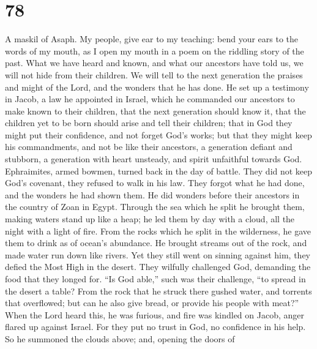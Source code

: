 \hypertarget{section-77}{%
\section{78}\label{section-77}}

A maskil of Asaph.  My people, give ear to my teaching: bend
your ears to the words of my mouth,  as I open my mouth in a
poem on the riddling story of the past.  What we have heard
and known, and what our ancestors have told us,  we will not
hide from their children. We will tell to the next generation the
praises and might of the Lord, and the wonders that he has done.
 He set up a testimony in Jacob, a law he appointed in
Israel, which he commanded our ancestors to make known to their
children,  that the next generation should know it, that the
children yet to be born should arise and tell their children;
 that in God they might put their confidence, and not forget
God's works; but that they might keep his commandments,  and
not be like their ancestors, a generation defiant and stubborn, a
generation with heart unsteady, and spirit unfaithful towards God.
 Ephraimites, armed bowmen, turned back in the day of
battle.  They did not keep God's covenant, they refused to
walk in his law.  They forgot what he had done, and the
wonders he had shown them.  He did wonders before their
ancestors in the country of Zoan in Egypt.  Through the sea
which he split he brought them, making waters stand up like a heap;
 he led them by day with a cloud, all the night with a
light of fire.  From the rocks which he split in the
wilderness, he gave them to drink as of ocean's abundance. 
He brought streams out of the rock, and made water run down like rivers.
 Yet they still went on sinning against him, they defied
the Most High in the desert.  They wilfully challenged God,
demanding the food that they longed for.  ``Is God able,''
such was their challenge, ``to spread in the desert a table?
 From the rock that he struck there gushed water, and
torrents that overflowed; but can he also give bread, or provide his
people with meat?''  When the Lord heard this, he was
furious, and fire was kindled on Jacob, anger flared up against Israel.
 For they put no trust in God, no confidence in his help.
 So he summoned the clouds above; and, opening the doors of
